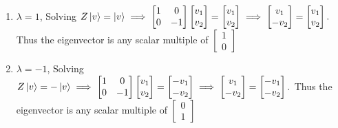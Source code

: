 \documentclass{article}
\begin{document}
\begin{framed}
\begin{enumerate}
        \begin{enumerate}
            \item $\lambda = 1$, Solving $Z\ket{v} = \ket{v} \implies \begin{bmatrix} 1 & 0 \\ 0 & -1 \end{bmatrix} \begin{bmatrix} v_1 \\ v_2 \end{bmatrix} = \begin{bmatrix} v_1 \\ v_2 \end{bmatrix} \implies \begin{bmatrix} v_1 \\ -v_2 \end{bmatrix} = \begin{bmatrix} v_1 \\ v_2 \end{bmatrix}.$ Thus the eigenvector is any scalar multiple of $\begin{bmatrix} 1 \\ 0 \end{bmatrix}$

            \item $\lambda = -1$, Solving $Z\ket{v} = -\ket{v} \implies \begin{bmatrix} 1 & 0 \\ 0 & -1 \end{bmatrix} \begin{bmatrix} v_1 \\ v_2 \end{bmatrix} = \begin{bmatrix} -v_1 \\ -v_2 \end{bmatrix} \implies \begin{bmatrix} v_1 \\ -v_2 \end{bmatrix} = \begin{bmatrix} -v_1 \\ -v_2 \end{bmatrix}.$ Thus the eigenvector is any scalar multiple of $\begin{bmatrix} 0 \\ 1 \end{bmatrix}$
        \end{enumerate}
    \end{enumerate}

\end{framed}
\end{document}
